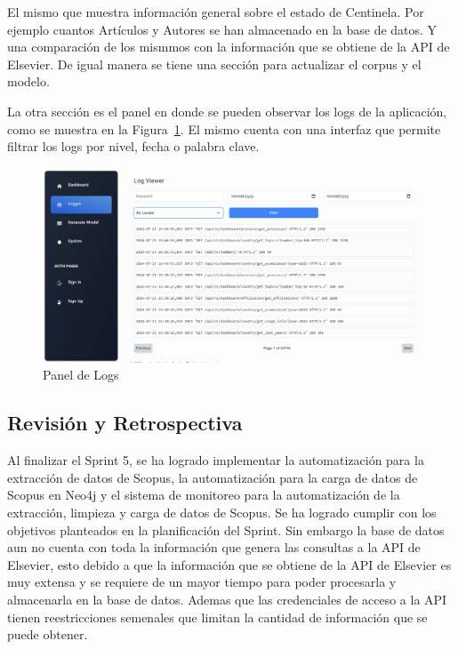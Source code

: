 El mismo que muestra información general sobre el estado de Centinela. Por ejemplo cuantos Artículos y Autores se han almacenado en la base de datos.
Y una comparación de los mismmos con la información que se obtiene de la API de Elsevier.
De igual manera se tiene una sección para actualizar el corpus y el modelo.

La otra sección es el panel en donde se pueden observar los logs de la aplicación, como se muestra en la Figura~\ref{fig:logs-panel}.
El mismo cuenta con una interfaz que permite filtrar los logs por nivel, fecha o palabra clave.
\begin{figure}[H]
    \centering
    \includegraphics[scale=0.37]{../02Figures/02Chapter/Sprints/Sprint-5/logs-panel.png}
    \caption{Panel de Logs}\label{fig:logs-panel}
\end{figure}



\subsection{Revisión y Retrospectiva}
Al finalizar el Sprint 5, se ha logrado implementar la automatización para la extracción de datos de Scopus, la automatización para la carga de datos de Scopus en Neo4j y el sistema de monitoreo para la automatización de la extracción, limpieza y carga de datos de Scopus.
Se ha logrado cumplir con los objetivos planteados en la planificación del Sprint.
Sin embargo la base de datos aun no cuenta con toda la información que genera las consultas a la API de Elsevier, esto debido a que la información que se obtiene de la API de Elsevier es muy extensa y se requiere de un mayor tiempo para poder procesarla y almacenarla en la base de datos.
Ademas que las credenciales de acceso a la API tienen reestricciones semenales que limitan la cantidad de información que se puede obtener.
